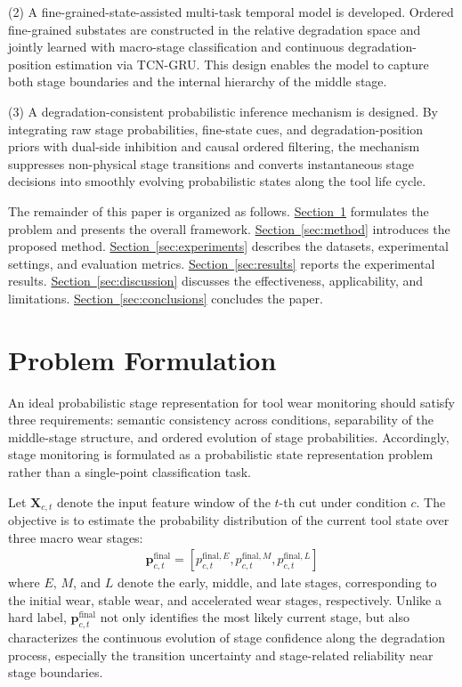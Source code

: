 \documentclass[a4paper,fleqn]{cas-sc}
\providecommand{\secref}{}
\renewcommand{\secref}[1]{\hyperref[#1]{Section~\ref*{#1}}}
\begin{document}
(2) A fine-grained-state-assisted multi-task temporal model is developed. Ordered fine-grained substates are constructed in the relative degradation space and jointly learned with macro-stage classification and continuous degradation-position estimation via TCN-GRU. This design enables the model to capture both stage boundaries and the internal hierarchy of the middle stage.

(3) A degradation-consistent probabilistic inference mechanism is designed. By integrating raw stage probabilities, fine-state cues, and degradation-position priors with dual-side inhibition and causal ordered filtering, the mechanism suppresses non-physical stage transitions and converts instantaneous stage decisions into smoothly evolving probabilistic states along the tool life cycle.

The remainder of this paper is organized as follows. \secref{sec:problem} formulates the problem and presents the overall framework. \secref{sec:method} introduces the proposed method. \secref{sec:experiments} describes the datasets, experimental settings, and evaluation metrics. \secref{sec:results} reports the experimental results. \secref{sec:discussion} discusses the effectiveness, applicability, and limitations. \secref{sec:conclusions} concludes the paper.

\section{Problem Formulation}
\label{sec:problem}
An ideal probabilistic stage representation for tool wear monitoring should satisfy three requirements: semantic consistency across conditions, separability of the middle-stage structure, and ordered evolution of stage probabilities. Accordingly, stage monitoring is formulated as a probabilistic state representation problem rather than a single-point classification task.

Let $\mathbf{X}_{c,t}$ denote the input feature window of the $t$-th cut under condition $c$. The objective is to estimate the probability distribution of the current tool state over three macro wear stages:
\begin{equation}
  \begin{aligned}
    \mathbf{p}_{c,t}^{\mathrm{final}}=[p_{c,t}^{\mathrm{final},E},p_{c,t}^{\mathrm{final},M},p_{c,t}^{\mathrm{final},L}]
  \end{aligned}
\end{equation}
where $E$, $M$, and $L$ denote the early, middle, and late stages, corresponding to the initial wear, stable wear, and accelerated wear stages, respectively. Unlike a hard label, $\mathbf{p}_{c,t}^{\mathrm{final}}$ not only identifies the most likely current stage, but also characterizes the continuous evolution of stage confidence along the degradation process, especially the transition uncertainty and stage-related reliability near stage boundaries.
\end{document}
